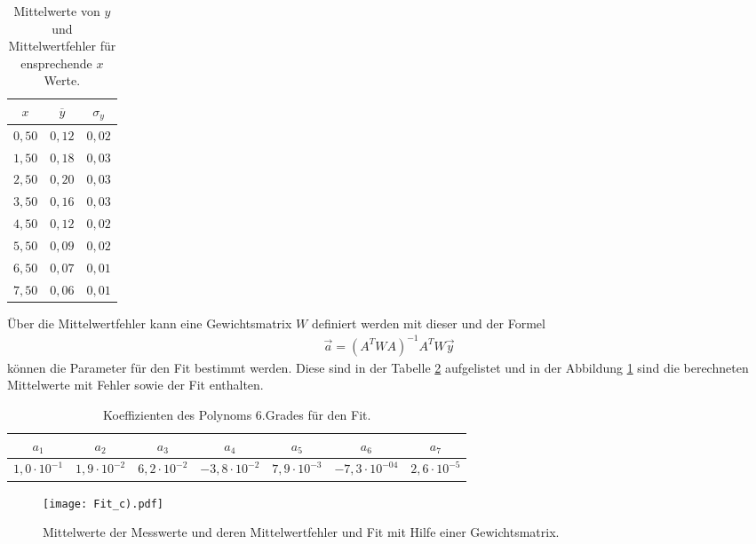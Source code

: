 \begin{table}
  \centering
  \caption{Mittelwerte von $y$ und Mittelwertfehler für ensprechende $x$ Werte.}
  \label{tab:mitt}
  \begin{tabular}{ c c c}
\toprule
 $x$ & $\overline{y}$ & $\sigma_y $\\
  \midrule
  $0,50$ & $0,12 $ & $ 0,02$\\
  $1,50$ & $0,18 $ & $0,03 $\\
  $2,50$ & $0,20 $ & $0,03 $\\
  $3,50$ & $0,16 $ & $0,03 $\\
  $4,50$ & $0,12 $ & $0,02 $\\
  $5,50$ & $0,09 $ & $0,02 $\\
  $6,50$ & $0,07 $ & $0,01 $\\
  $7,50$ & $0,06 $ & $0,01 $\\
\bottomrule
  \end{tabular}
\end{table}

Über die Mittelwertfehler kann eine Gewichtsmatrix $W$
definiert werden mit dieser und der Formel
\begin{align}
  \vec a=(A^TWA)^{-1} A^T W \vec y
\end{align}
  können die Parameter für den Fit bestimmt werden.
  Diese sind in der Tabelle \ref{tab:c}
  aufgelistet und in der Abbildung \ref{fig:c}
  sind die berechneten Mittelwerte mit Fehler sowie der
  Fit enthalten.

  \begin{table}
    \caption{Koeffizienten des Polynoms 6.Grades für den Fit.}
    \label{tab:c}
    \begin{tabular}{c c c c c c c}
  \toprule
      $a_1 $&$ a_2 $&$ a_3 $&$  a_4 $&$  a_5 $&$ a_6 $&$a_7$\\
  \midrule
  $1,0\cdot 10^{-1} $&$   1,9\cdot 10^{-2} $&$   6,2\cdot 10^{-2} $&$  -3,8\cdot 10^{-2} $&$
  7,9\cdot 10^{-3} $&$ -7,3\cdot 10^{-04}  $&$ 2,6\cdot 10^{-5}$\\
  \bottomrule
    \end{tabular}
  \end{table}


  \begin{figure}
    \centering
    \texttt{[image: Fit\_c).pdf]}
    \caption{Mittelwerte der Messwerte und deren Mittelwertfehler
     und Fit mit Hilfe einer Gewichtsmatrix.}
    \label{fig:c}
  \end{figure}
